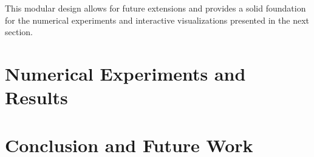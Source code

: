\documentclass{article}
\begin{document}
This modular design allows for future extensions and provides a solid foundation for the numerical experiments and interactive visualizations presented in the next section.

\section{Numerical Experiments and Results}

\section{Conclusion and Future Work}



\end{document}
